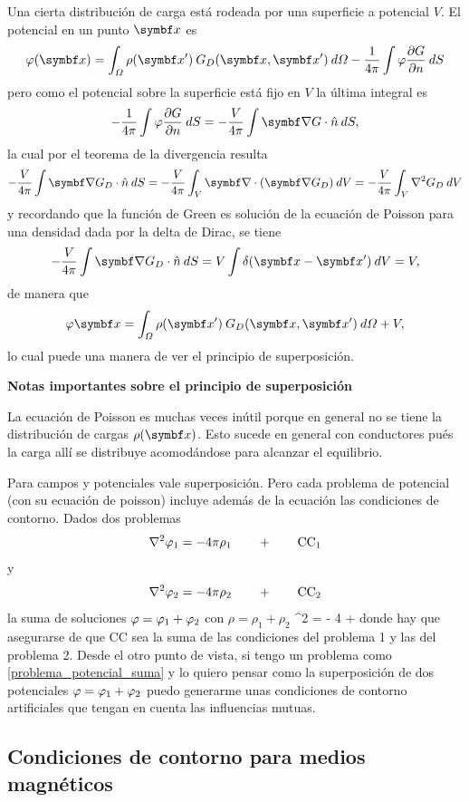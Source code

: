 \documentclass[10pt,oneside]{CBFT_book}
\begin{document}
Una cierta distribución de carga está rodeada por una superficie a potencial $V$.
El potencial en un punto $\vbx$ es
\[
	\vp(\vbx) = \int_\Omega \rho(\vbx') \: G_D(\vbx,\vbx') \: d\Omega 
	- \frac{1}{4\pi} \int \vp \dpar{G}{n} \: dS
\]
pero como el potencial sobre la superficie está fijo en $V$ la última integral es 
\[
	- \frac{1}{4\pi} \int \vp \dpar{G}{n} \: dS = - \frac{V}{4\pi} \int \Nabla G \cdot\hat{n} \: dS,
\]
la cual por el teorema de la divergencia resulta
\[
	- \frac{V}{4\pi} \int \Nabla G_D \cdot\hat{n} \: dS =
	- \frac{V}{4\pi} \int_V \Nabla \cdot (\Nabla G_D) \: dV =
	- \frac{V}{4\pi} \int_V \lapm{G_D} \: dV
\]
y recordando que la función de Green es solución de la ecuación de Poisson para una densidad dada por
la delta de Dirac, se tiene
\[
	- \frac{V}{4\pi} \int \Nabla G_D \cdot\hat{n} \: dS = 
	V \int \delta(\vbx - \vbx') \: dV = V,
\]
de manera que 
\[
	\vp{\vbx} = \int_\Omega \rho(\vbx') \: G_D(\vbx,\vbx') \: d\Omega  + V,
\]
lo cual puede una manera de ver el principio de superposición.


\textbf{Notas importantes sobre el principio de superposición}

La ecuación de Poisson es muchas veces inútil porque en general no se tiene la distribución de cargas
$ \rho(\vbx) $. Esto sucede en general con conductores pués la carga allí se distribuye acomodándose
para alcanzar el equilibrio.

Para campos y potenciales vale superposición.
Pero cada problema de potencial (con su ecuación de poisson) incluye además de la ecuación las condiciones
de contorno. 
Dados dos problemas
\[
	\nabla^2 \varphi_1 = - 4 \pi \rho_1 \qquad + \qquad \text{CC}_1
\]
y
\[
	\nabla^2 \varphi_2 = - 4 \pi \rho_2 \qquad + \qquad \text{CC}_2
\]
la suma de soluciones $ \varphi = \varphi_1 + \varphi_2 $ con $\rho = \rho_1 + \rho_2 $
\be
	\nabla^2 \rho = - 4 \pi \rho \qquad + \qquad {}
	\label{problema_potencial_suma}
\ee
donde hay que asegurarse de que $ \text{CC} $ sea la suma de las condiciones del problema 1 y las del
problema 2.
Desde el otro punto de vista, si tengo un problema como \eqref{problema_potencial_suma} y lo quiero
pensar como la superposición de dos potenciales $ \varphi = \varphi_1 + \varphi_2 $ puedo generarme unas condiciones
de contorno artificiales que tengan en cuenta las influencias mutuas.


\subsection{Condiciones de contorno para medios magnéticos}
\end{document}
